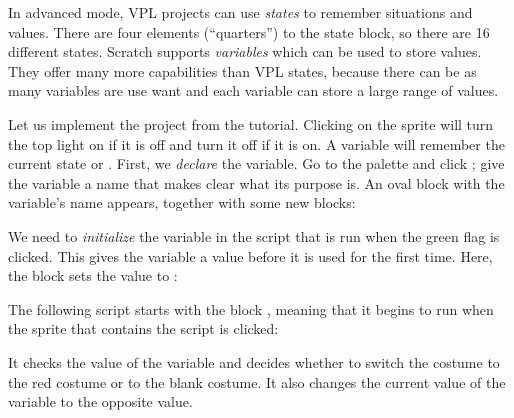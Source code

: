 \label{ch.variables}


In advanced mode, VPL projects can use \emph{states} to remember
situations and values. There are four elements (``quarters'') to the
state block, so there are 16 different states. Scratch supports
\emph{variables} which can be used to store values. They offer many more
capabilities than VPL states, because there can be as many variables are
use want and each variable can store a large range of values.


Let us implement the project  from the tutorial. Clicking
on the  sprite will turn the top light on if it is off and turn it
off if it is on. A variable will remember the current state 
or . First, we \emph{declare} the variable. Go to the 
palette and click ; give the variable a name that
makes clear what its purpose is. An oval block with
the variable's name appears, together with some new blocks:



We need to \emph{initialize} the variable in the script that is
run when the green flag is clicked. This gives the variable a
value before it is used for the first time. Here, the block
 sets the value to :


The following script starts with the block ,
meaning that it begins to run when the sprite that contains the script is clicked:
 

It checks the value of the variable  and decides whether to
switch the costume to the red costume or to the blank costume. It also
changes the current value of the variable  to the opposite
value.






